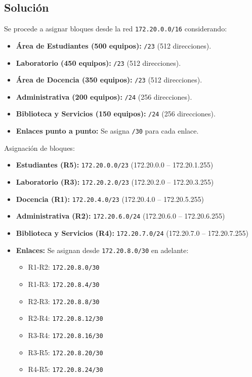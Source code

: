 \documentclass[a4paper,12pt]{article}
\begin{document}
\subsection{Solución}
Se procede a asignar bloques desde la red \texttt{172.20.0.0/16} considerando:
\begin{itemize}
  \item \textbf{Área de Estudiantes (500 equipos):} \texttt{/23} (512 direcciones).
  \item \textbf{Laboratorio (450 equipos):} \texttt{/23} (512 direcciones).
  \item \textbf{Área de Docencia (350 equipos):} \texttt{/23} (512 direcciones).
  \item \textbf{Administrativa (200 equipos):} \texttt{/24} (256 direcciones).
  \item \textbf{Biblioteca y Servicios (150 equipos):} \texttt{/24} (256 direcciones).
  \item \textbf{Enlaces punto a punto:} Se asigna \texttt{/30} para cada enlace.
\end{itemize}

Asignación de bloques:
\begin{itemize}
  \item \textbf{Estudiantes (R5):} \texttt{172.20.0.0/23} \quad (172.20.0.0 -- 172.20.1.255)
  \item \textbf{Laboratorio (R3):} \texttt{172.20.2.0/23} \quad (172.20.2.0 -- 172.20.3.255)
  \item \textbf{Docencia (R1):} \texttt{172.20.4.0/23} \quad (172.20.4.0 -- 172.20.5.255)
  \item \textbf{Administrativa (R2):} \texttt{172.20.6.0/24} \quad (172.20.6.0 -- 172.20.6.255)
  \item \textbf{Biblioteca y Servicios (R4):} \texttt{172.20.7.0/24} \quad (172.20.7.0 -- 172.20.7.255)
  \item \textbf{Enlaces:} Se asignan desde \texttt{172.20.8.0/30} en adelante:
    \begin{itemize}
      \item R1-R2: \texttt{172.20.8.0/30}
      \item R1-R3: \texttt{172.20.8.4/30}
      \item R2-R3: \texttt{172.20.8.8/30}
      \item R2-R4: \texttt{172.20.8.12/30}
      \item R3-R4: \texttt{172.20.8.16/30}
      \item R3-R5: \texttt{172.20.8.20/30}
      \item R4-R5: \texttt{172.20.8.24/30}
    \end{itemize}
\end{itemize}
\end{document}
